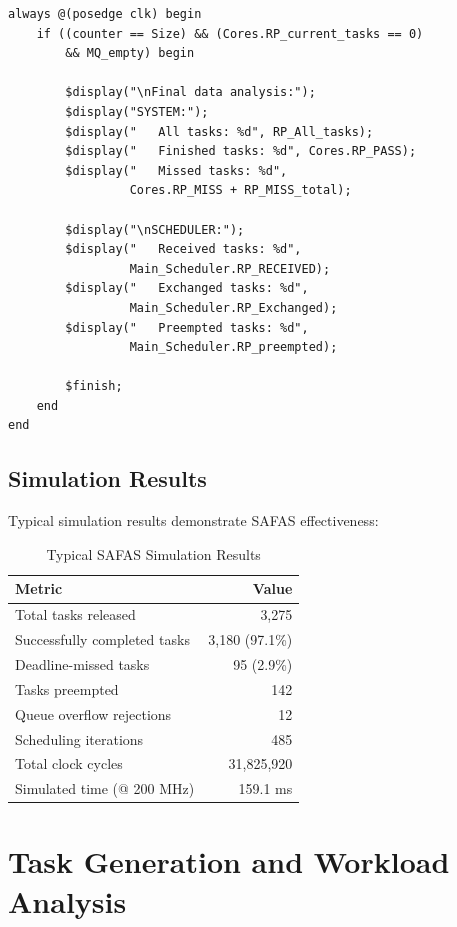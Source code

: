 \documentclass[12pt,a4paper]{article}
\begin{document}
\begin{lstlisting}[style=verilog, caption={Termination Condition}]
always @(posedge clk) begin
    if ((counter == Size) && (Cores.RP_current_tasks == 0)
        && MQ_empty) begin

        $display("\nFinal data analysis:");
        $display("SYSTEM:");
        $display("   All tasks: %d", RP_All_tasks);
        $display("   Finished tasks: %d", Cores.RP_PASS);
        $display("   Missed tasks: %d",
                 Cores.RP_MISS + RP_MISS_total);

        $display("\nSCHEDULER:");
        $display("   Received tasks: %d",
                 Main_Scheduler.RP_RECEIVED);
        $display("   Exchanged tasks: %d",
                 Main_Scheduler.RP_Exchanged);
        $display("   Preempted tasks: %d",
                 Main_Scheduler.RP_preempted);

        $finish;
    end
end
\end{lstlisting}

\subsection{Simulation Results}

Typical simulation results demonstrate SAFAS effectiveness:

\begin{table}[H]
\centering
\begin{tabular}{|l|r|}
\hline
\textbf{Metric} & \textbf{Value} \\
\hline
Total tasks released & 3,275 \\
Successfully completed tasks & 3,180 (97.1\%) \\
Deadline-missed tasks & 95 (2.9\%) \\
Tasks preempted & 142 \\
Queue overflow rejections & 12 \\
Scheduling iterations & 485 \\
Total clock cycles & 31,825,920 \\
Simulated time (@ 200 MHz) & 159.1 ms \\
\hline
\end{tabular}
\caption{Typical SAFAS Simulation Results}
\label{tab:sim_results}
\end{table}

\section{Task Generation and Workload Analysis}
\end{document}
